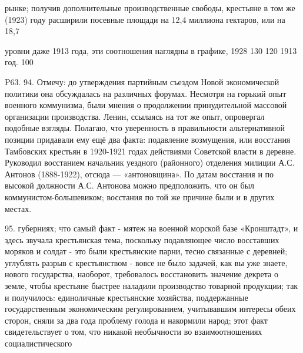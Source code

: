 рынке; получив дополнительные производственные свободы, крестьяне в том же (1923) году расширили посевные площади на 12,4 миллиона гектаров, или на 18,7%

уровни даже 1913 года, эти соотношения наглядны в графике, 1928 130 120 1913 год. 100%

P63. 94. Отмечу: до утверждения партийным съездом Новой экономической политики она обсуждалась на различных форумах. Несмотря на горький опыт военного коммунизма, были мнения о продолжении принудительной массовой организации производства. Ленин, ссылаясь на тот же опыт, опровергал подобные взгляды. Полагаю, что уверенность в правильности альтернативной позиции придавали ему ещё два факта: подавление возмущения, или восстания Тамбовских крестьян в 1920-1921 годах действиями Советской власти в деревне. Руководил восстанием начальник уездного (районного) отделения милиции А.С. Антонов (1888-1922), отсюда — «антоновщина». По датам восстания и по высокой должности А.С. Антонова можно предположить, что он был коммунистом-большевиком; восстания по той же причине были и в других местах.

95. губерниях; что самый факт - мятеж на военной морской базе «Кронштадт», и здесь звучала крестьянская тема, поскольку подавляющее число восставших моряков и солдат - это были крестьянские парни, тесно связанные с деревней; углублять разрыв с крестьянством - вовсе не было задачей, как вы уже знаете, нового государства, наоборот, требовалось восстановить значение декрета о земле, чтобы крестьяне быстрее наладили производство товарной продукции; так и получилось: единоличные крестьянские хозяйства, поддержанные государственным экономическим регулированием, учитывавшим интересы обеих сторон, сняли за два года проблему голода и накормили народ; этот факт свидетельствует о том, что никакой необычности во взаимоотношениях социалистического

